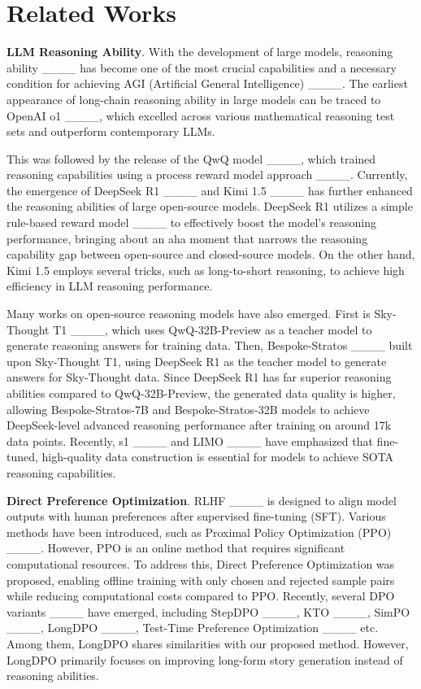\section{Related Works}
\textbf{LLM Reasoning Ability}. With the development of large models, reasoning ability ____ has become one of the most crucial capabilities and a necessary condition for achieving AGI (Artificial General Intelligence) 
____. The earliest appearance of long-chain reasoning ability in large models can be traced to OpenAI o1 ____, which excelled across various mathematical reasoning test sets and outperform contemporary LLMs.

This was followed by the release of the QwQ model ____, which trained reasoning capabilities using a process reward model approach ____. Currently, the emergence of DeepSeek R1 ____ and Kimi 1.5 ____ has further enhanced the reasoning abilities of large open-source models. DeepSeek R1 utilizes a simple rule-based reward model ____ to effectively boost the model’s reasoning performance, bringing about an aha moment that narrows the reasoning capability gap between open-source and closed-source models. On the other hand, Kimi 1.5 employs several tricks, such as long-to-short reasoning, to achieve high efficiency in LLM reasoning performance.

Many works on open-source reasoning models have also emerged. First is Sky-Thought T1 ____, which uses QwQ-32B-Preview as a teacher model to generate reasoning answers for training data. Then, Bespoke-Stratos ____ built upon Sky-Thought T1, using DeepSeek R1 as the teacher model to generate answers for Sky-Thought data. Since DeepSeek R1 has far superior reasoning abilities compared to QwQ-32B-Preview, the generated data quality is higher, allowing Bespoke-Stratos-7B and Bespoke-Stratos-32B models to achieve DeepSeek-level advanced reasoning performance after training on around 17k data points. Recently, s1 ____ and LIMO ____ have emphasized that fine-tuned, high-quality data construction is essential for models to achieve SOTA reasoning capabilities. 

\textbf{Direct Preference Optimization}. RLHF 
 ____ is designed to align model outputs with human preferences after supervised fine-tuning (SFT). Various methods have been introduced, such as Proximal Policy Optimization (PPO) 
 ____. However, PPO is an online method that requires significant computational resources. To address this, Direct Preference Optimization was proposed, enabling offline training with only chosen and rejected sample pairs while reducing computational costs compared to PPO. Recently, several DPO variants ____ have emerged, including StepDPO ____, KTO ____, SimPO ____, LongDPO ____, Test-Time Preference Optimization ____ etc. Among them, LongDPO shares similarities with our proposed method. However, LongDPO primarily focuses on improving long-form story generation instead of reasoning abilities.